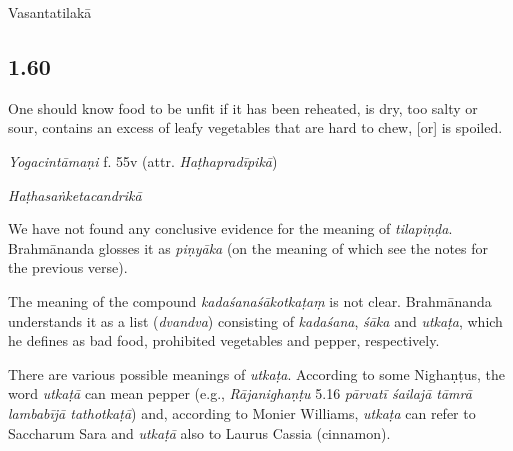 \begin{ekdosis}
\begin{metre}[hp01_059]
Vasantatilakā 
\end{metre}

\subsection*{1.60}
\begin{translation}[hp01_060]
One should know food to be unfit if it has been reheated, is dry, too salty or sour, contains an excess of leafy vegetables that are hard to chew, [or] is spoiled.
\end{translation}


\begin{testimonia}[hp01_060]
\emph{Yogacintāmaṇi} f. 55v (attr. \emph{Haṭhapradīpikā})

\begin{versinnote}
\end{versinnote}

\emph{Haṭhasaṅketacandrikā}

\begin{versinnote}
\end{versinnote}

\end{testimonia}

\begin{philcomm}[hp01_060]
We have not found any conclusive evidence for the meaning of \emph{tilapiṇḍa}. Brahmānanda glosses it as \emph{piṇyāka} (on the meaning of which see the notes for the previous verse).

The meaning of the compound \emph{kadaśanaśākotkaṭaṃ} is not clear. Brahmānanda understands it as a list (\emph{dvandva}) consisting of \emph{kadaśana}, \emph{śāka} and \emph{utkaṭa}, which he defines as bad food, prohibited vegetables and pepper, respectively.

There are various possible meanings of \emph{utkaṭa}. According to some Nighaṇṭus, the word \emph{utkaṭā} can mean pepper  (e.g., \emph{Rājanighaṇṭu} 5.16 \emph{pārvatī śailajā tāmrā lambabījā tathotkaṭā}) and, according to Monier Williams, \emph{utkaṭa} can refer to Saccharum Sara and \emph{utkaṭā} also to Laurus Cassia (cinnamon). 


\end{philcomm}
\end{ekdosis}
